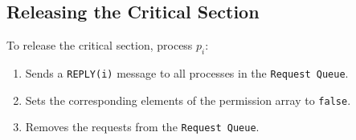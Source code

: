 \subsection{Releasing the Critical Section}
To release the critical section, process \( p_i \):
\begin{enumerate}
    \item Sends a \texttt{REPLY(i)} message to all processes in the \texttt{Request Queue}.
    \item Sets the corresponding elements of the permission array to \texttt{false}.
    \item Removes the requests from the \texttt{Request Queue}.
\end{enumerate}
